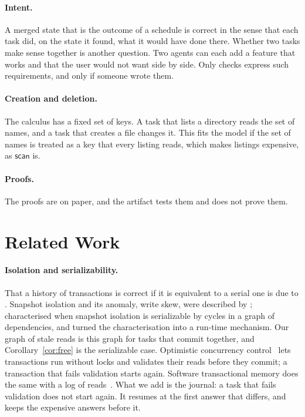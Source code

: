 \documentclass[acmsmall,nonacm,screen]{acmart}
\newcommand{\kw}[1]{\mathsf{#1}}
\newcommand{\scan}{\kw{scan}}
\begin{document}
\paragraph{Intent.} A merged state that is the outcome of a schedule is correct in the
sense that each task did, on the state it found, what it would have done there. Whether two
tasks make sense together is another question. Two agents can each add a feature that works
and that the user would not want side by side. Only checks express such requirements, and
only if someone wrote them.

\paragraph{Creation and deletion.} The calculus has a fixed set of keys. A task that lists a
directory reads the set of names, and a task that creates a file changes it. This fits the
model if the set of names is treated as a key that every listing reads, which makes listings
expensive, as $\scan$ is.

\paragraph{Proofs.} The proofs are on paper, and the artifact tests them and does not prove
them.

\section{Related Work}
\label{sec:related}

\paragraph{Isolation and serializability.} That a history of transactions is correct if it
is equivalent to a serial one is due to \citet{papadimitriou1979}. Snapshot isolation and
its anomaly, write skew, were described by \citet{berenson1995}; \citet{fekete2005}
characterised when snapshot isolation is serializable by cycles in a graph of dependencies,
and \citet{cahill2008} turned the characterisation into a run-time mechanism. Our graph of
stale reads is this graph for tasks that commit together, and Corollary~\ref{cor:free} is
the serializable case. Optimistic concurrency control~\citep{kung1981} lets transactions run
without locks and validates their reads before they commit; a transaction that fails
validation starts again. Software transactional memory does the same with a log of
reads~\citep{harris2005}. What we add is the journal: a task that fails validation does not
start again. It resumes at the first answer that differs, and keeps the expensive answers
before it.
\end{document}
